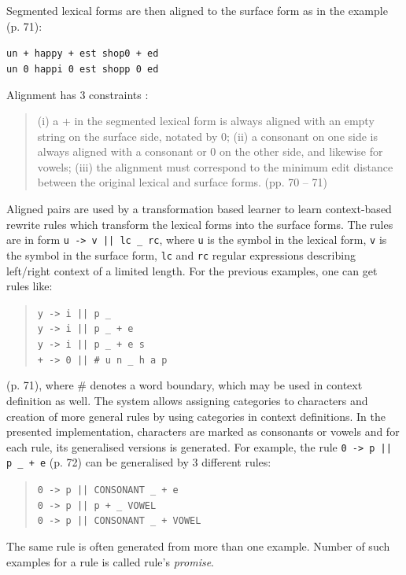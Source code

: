 Segmented lexical forms are then aligned to the surface form as in the example (p. 71):
\begin{center}
\texttt{un + happy + est \hspace{10pt}  shop0 + ed\\
un 0 happi 0 est \hspace{10pt} shopp 0 ed}
\end{center} 
Alignment has 3 constraints : \begin{quote}
(i) a + in the segmented lexical form is always aligned with an empty string on the surface
side, notated by 0; (ii) a consonant on one side is always aligned with a consonant or 0 on the other side, and likewise for vowels; (iii) the alignment must correspond to the minimum edit distance between the original lexical and surface forms. (pp. 70 -- 71)
\end{quote}
Aligned pairs are used by a transformation based learner to learn context-based rewrite rules which transform the lexical forms into the surface forms. The rules are in form \texttt{u -> v || lc \_ rc}, where \texttt{u} is the symbol in the lexical form, \texttt{v} is the symbol in the surface form,  \texttt{lc} and  \texttt{rc} regular expressions describing left/right context of a limited length. For the previous examples, one can get rules like:
\begin{quote}
\begin{flushleft}
\texttt{y -> i || p \_ \\ 
y -> i || p \_ + e\\
y -> i || p \_ + e s \\ 
+ -> 0 || \# u n \_ h a p\\}
\end{flushleft}
\end{quote}
(p. 71), where \# denotes a word boundary, which may be used in context definition as well. The system allows assigning categories to characters and creation of more general rules by using categories in context definitions. In the presented implementation, characters are marked as consonants or vowels and for each rule, its generalised versions is generated. For example, the rule \texttt{0 -> p || p \_ + e} (p. 72) can be generalised by 3 different rules: \begin{quote}
\begin{flushleft}
\texttt{0 -> p || CONSONANT \_ + e}\\
\texttt{0 -> p || p + \_ VOWEL}\\
\texttt{0 -> p || CONSONANT \_ + VOWEL}\\
\end{flushleft}
\end{quote}
The same rule is often generated from more than one example. Number of such examples for a rule is called rule's \emph{promise}.

